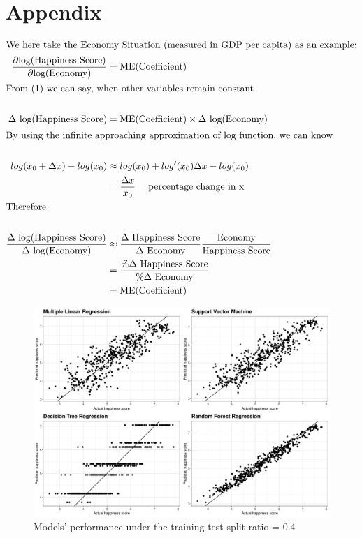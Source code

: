 \documentclass[11pt,a4paper,]{article}
\begin{document}
\clearpage

\hypertarget{appendix}{%
\section{Appendix}\label{appendix}}

\begin{align*}
\intertext{We here take the Economy Situation (measured in GDP per capita) as an example:}
\frac{\partial \text{log(Happiness Score)}}{\partial \text{log(Economy)}} &= \text{ME(Coefficient)}\\
\intertext{From (1) we can say, when other variables remain constant }\nonumber \\
\Delta \text{ log(Happiness Score)} &= \text{ME(Coefficient)} \times \Delta \text{ log(Economy)}\\
\intertext{By using the infinite approaching approximation of log function, we can know}\nonumber\\
log(x_0 + \Delta x) - log(x_0) &\approx log(x_0) + log'(x_0)\Delta x - log(x_0)\\
&=  \frac{\Delta x}{x_0} = \text{percentage change in x}\nonumber\\
\intertext{Therefore}\nonumber\\
\frac{\Delta \text{ log(Happiness Score)}}{\Delta \text{ log(Economy)}} &\approx \frac{\Delta \text{ Happiness Score}}{\Delta \text{ Economy} }\frac{\text{Economy}}{\text{Happiness Score}}\\
&=\frac{\% \Delta \text{ Happiness Score}}{\% \Delta \text{ Economy}} \nonumber\\
&= \text{ME(Coefficient)}\nonumber
\end{align*}

\begin{figure}

{\centering \includegraphics[width=0.7\linewidth]{figure/ggsp04} 

}

\caption{Models' performance under the training test split ratio = 0.4}\label{fig:ggsp04}
\end{figure}
\end{document}
